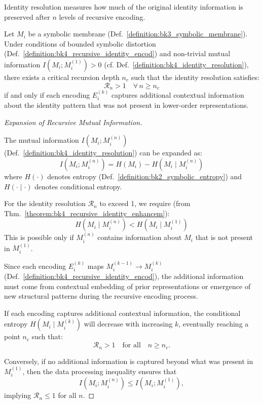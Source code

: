 Identity resolution measures how much of the original identity information is preserved after $n$ levels of recursive encoding.
\begin{theorem}
\label{theorem:bk4_recursive_identity_enhancem}
Let $M_i$ be a symbolic membrane (Def.~\ref{definition:bk3_symbolic_membrane}). Under conditions of bounded symbolic distortion (Def.~\ref{definition:bk4_recursive_identity_encod}) and non-trivial mutual information $I(M_i; M_i^{(1)}) > 0$ (cf. Def.~\ref{definition:bk4_identity_resolution}), there exists a critical recursion depth $n_c$ such that the identity resolution satisfies:
\[
\mathcal{R}_n > 1 \quad \forall\, n \geq n_c
\]
if and only if each encoding $E_i^{(k)}$ captures additional contextual information about the identity pattern that was not present in lower-order representations.
\end{theorem}
\begin{proof}[Expansion of Recursive Mutual Information]
\label{proof:bk4_mutual_information_expansion}
\leavevmode

The mutual information $I(M_i; M_i^{(n)})$ (Def.~\ref{definition:bk4_identity_resolution}) can be expanded as:
\begin{equation}
    I(M_i; M_i^{(n)}) = H(M_i) - H(M_i \mid M_i^{(n)})
    \label{eq:bk4_mutual_information_entropy_proof}
\end{equation}
where $H(\cdot)$ denotes entropy (Def.~\ref{definition:bk2_symbolic_entropy}) and $H(\cdot \mid \cdot)$ denotes conditional entropy.

For the identity resolution $\mathcal{R}_n$ to exceed 1, we require (from Thm.~\ref{theorem:bk4_recursive_identity_enhancem}):
\begin{equation}
    H(M_i \mid M_i^{(n)}) < H(M_i \mid M_i^{(1)})
    \label{eq:bk4_conditional_entropy_inequality_proof}
\end{equation}
This is possible only if $M_i^{(n)}$ contains information about $M_i$ that is not present in $M_i^{(1)}$.

Since each encoding $E_i^{(k)}$ maps $M_i^{(k-1)} \to M_i^{(k)}$ (Def.~\ref{definition:bk4_recursive_identity_encod}), the additional information must come from contextual embedding of prior representations or emergence of new structural patterns during the recursive encoding process.

If each encoding captures additional contextual information, the conditional entropy
\( H(M_i \mid M_i^{(k)}) \) will decrease with increasing \( k \), eventually reaching a point \( n_c \)
such that:
\[
\mathcal{R}_n > 1 \quad \text{for all} \quad n \geq n_c.
\]

Conversely, if no additional information is captured beyond what was present in $M_i^{(1)}$, then the data processing inequality ensures that
\[
I(M_i; M_i^{(n)}) \leq I(M_i; M_i^{(1)}),
\]
implying $\mathcal{R}_n \leq 1$ for all $n$.
\end{proof}
